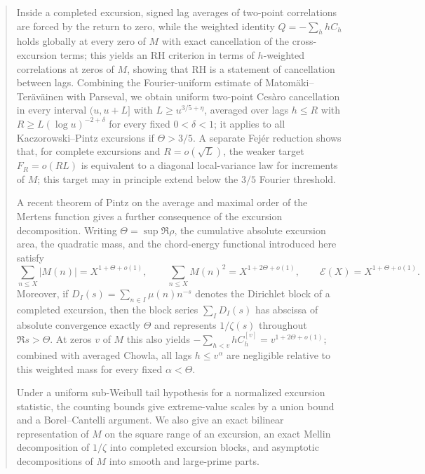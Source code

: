 \documentclass[11pt]{amsart}
\numberwithin{equation}{section}
\theoremstyle{plain}
\theoremstyle{definition}
\theoremstyle{remark}
\newcommand{\En}{\mathcal{E}}
\begin{document}
\begin{abstract}
Inside a completed excursion, signed lag averages of two-point correlations
are forced by the return to zero, while the weighted identity
$Q=-\sum_hhC_h$ holds globally at every zero of $M$ with exact cancellation
of the cross-excursion terms; this yields an RH criterion in terms of
$h$-weighted correlations at zeros of $M$, showing that RH is a statement
of cancellation between lags. Combining the Fourier-uniform estimate of
Matom\"aki--Ter\"av\"ainen with Parseval, we obtain uniform two-point
Ces\`aro cancellation in every interval $(u,u+L]$ with $L\ge u^{3/5+\eta}$,
averaged over lags $h\le R$ with $R\ge L(\log u)^{-2+\delta}$ for every fixed $0<\delta<1$; it applies
to all Kaczorowski--Pintz excursions if $\Theta>3/5$. A separate Fej\'er reduction shows that, for complete excursions and $R=o(\sqrt L)$, the weaker target $F_R=o(RL)$ is equivalent to a diagonal local-variance law for increments of $M$; this target may in principle extend below the $3/5$ Fourier threshold.

A recent theorem of Pintz on the average and maximal order of the Mertens
function gives a further consequence of the excursion decomposition.  Writing
$\Theta=\sup\Re\rho$, the cumulative absolute excursion area, the quadratic
mass, and the chord-energy functional introduced here satisfy
\[
 \sum_{n\le X}|M(n)|=X^{1+\Theta+o(1)},\qquad
 \sum_{n\le X}M(n)^2=X^{1+2\Theta+o(1)},\qquad
 \En(X)=X^{1+\Theta+o(1)}.
\]
Moreover, if $D_I(s)=\sum_{n\in I}\mu(n)n^{-s}$ denotes the Dirichlet block
of a completed excursion, then the block series $\sum_I D_I(s)$ has abscissa
of absolute convergence exactly $\Theta$ and represents $1/\zeta(s)$
throughout $\Re s>\Theta$.  At zeros $v$ of $M$ this also yields
$-\sum_{h<v}hC_h^{[v]}=v^{1+2\Theta+o(1)}$; combined with averaged Chowla,
all lags $h\le v^\alpha$ are negligible relative to this weighted mass for
every fixed $\alpha<\Theta$.

Under a uniform sub-Weibull tail hypothesis for a normalized excursion
statistic, the counting bounds give extreme-value scales by a union bound
and a Borel--Cantelli argument. We also give an exact bilinear
representation of $M$ on the square range of an excursion, an exact Mellin
decomposition of $1/\zeta$ into completed excursion blocks, and asymptotic
decompositions of $M$ into smooth and large-prime parts.
\end{abstract}

\maketitle
\end{document}
